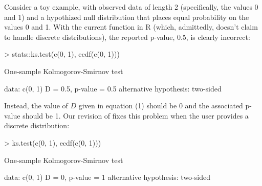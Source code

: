 Consider a toy example, with observed data of length 2 (specifically, the
values 0 and 1) and a hypothized null distribution that places equal
probability on the values 0 and 1.  With the current  function
in R (which, admittedly, doesn't claim to handle discrete distributions),
the reported p-value, 0.5, is clearly incorrect:
\begin{Schunk}
\begin{Sinput}
> stats::ks.test(c(0, 1), ecdf(c(0, 1)))
\end{Sinput}
\begin{Soutput}
	One-sample Kolmogorov-Smirnov test

data:  c(0, 1) 
D = 0.5, p-value = 0.5
alternative hypothesis: two-sided 
\end{Soutput}
\end{Schunk}
Instead, the value of $D$ given in equation (1)
should be 0 and the associated p-value should be 1.  Our revision of 
fixes this problem when the user provides a discrete distribution:
\begin{Schunk} 
\begin{Sinput}
> ks.test(c(0, 1), ecdf(c(0, 1)))
\end{Sinput}
\begin{Soutput}
	One-sample Kolmogorov-Smirnov test

data:  c(0, 1) 
D = 0, p-value = 1
alternative hypothesis: two-sided 
\end{Soutput}
\end{Schunk}


